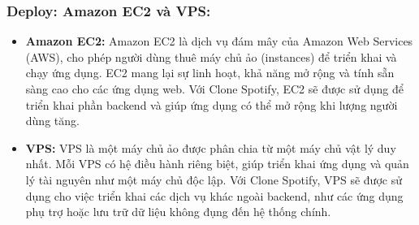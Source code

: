 \subsubsection{ Deploy: Amazon EC2 và VPS:}
\begin{itemize}
    \item \textbf{Amazon EC2:} Amazon EC2 là dịch vụ đám mây của Amazon Web Services (AWS), cho phép người dùng thuê máy chủ ảo (instances) để triển khai và chạy ứng dụng. EC2 mang lại sự linh hoạt, khả năng mở rộng và tính sẵn sàng cao cho các ứng dụng web. Với Clone Spotify, EC2 sẽ được sử dụng để triển khai phần backend và giúp ứng dụng có thể mở rộng khi lượng người dùng tăng.
    \item \textbf{VPS:} VPS là một máy chủ ảo được phân chia từ một máy chủ vật lý duy nhất. Mỗi VPS có hệ điều hành riêng biệt, giúp triển khai ứng dụng và quản lý tài nguyên như một máy chủ độc lập. Với Clone Spotify, VPS sẽ được sử dụng cho việc triển khai các dịch vụ khác ngoài backend, như các ứng dụng phụ trợ hoặc lưu trữ dữ liệu không đụng đến hệ thống chính.
\end{itemize}